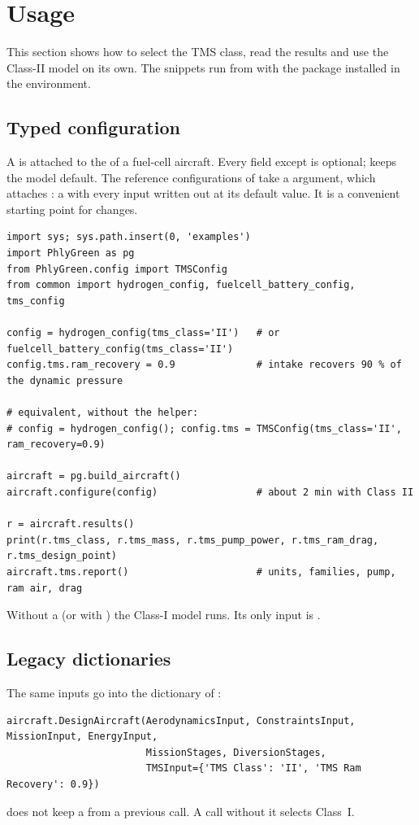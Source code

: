 \documentclass[a4paper,11pt]{article}
\begin{document}
\section{Usage}\label{sec:usage}

This section shows how to select the TMS class, read the results and use the Class-II model
on its own. The snippets run from  with the package installed in the
 environment.

\subsection{Typed configuration}
A  is attached to the  of a fuel-cell aircraft. Every
field except  is optional;  keeps the model default. The
reference configurations of  take a  argument,
which attaches : a  with every input
written out at its default value. It is a convenient starting point for changes.
\begin{lstlisting}
import sys; sys.path.insert(0, 'examples')
import PhlyGreen as pg
from PhlyGreen.config import TMSConfig
from common import hydrogen_config, fuelcell_battery_config, tms_config

config = hydrogen_config(tms_class='II')   # or fuelcell_battery_config(tms_class='II')
config.tms.ram_recovery = 0.9              # intake recovers 90 % of the dynamic pressure

# equivalent, without the helper:
# config = hydrogen_config(); config.tms = TMSConfig(tms_class='II', ram_recovery=0.9)

aircraft = pg.build_aircraft()
aircraft.configure(config)                 # about 2 min with Class II

r = aircraft.results()
print(r.tms_class, r.tms_mass, r.tms_pump_power, r.tms_ram_drag, r.tms_design_point)
aircraft.tms.report()                      # units, families, pump, ram air, drag
\end{lstlisting}
Without a  (or with ) the Class-I model runs. Its only
input is .

\subsection{Legacy dictionaries}
The same inputs go into the  dictionary of :
\begin{lstlisting}
aircraft.DesignAircraft(AerodynamicsInput, ConstraintsInput, MissionInput, EnergyInput,
                        MissionStages, DiversionStages,
                        TMSInput={'TMS Class': 'II', 'TMS Ram Recovery': 0.9})
\end{lstlisting}
 does not keep a  from a previous call. A call without it
selects Class~I.
\end{document}
